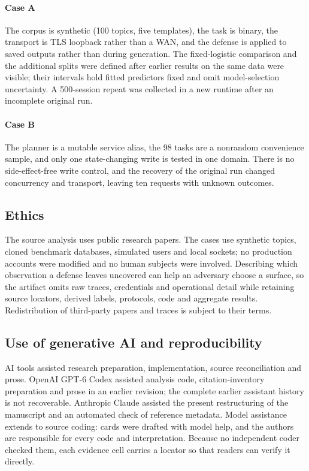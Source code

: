 \paragraph{Case A}
The corpus is synthetic (100 topics, five templates), the task is binary, the transport is TLS loopback rather than a WAN, and the defense is applied to saved outputs rather than during generation. The fixed-logistic comparison and the additional splits were defined after earlier results on the same data were visible; their intervals hold fitted predictors fixed and omit model-selection uncertainty. A 500-session repeat was collected in a new runtime after an incomplete original run.

\paragraph{Case B}
The planner is a mutable service alias, the 98 tasks are a nonrandom convenience sample, and only one state-changing write is tested in one domain. There is no side-effect-free write control, and the recovery of the original run changed concurrency and transport, leaving ten requests with unknown outcomes.

\subsection{Ethics}\label{sec:ethics}
The source analysis uses public research papers. The cases use synthetic topics, cloned benchmark databases, simulated users and local sockets; no production accounts were modified and no human subjects were involved. Describing which observation a defense leaves uncovered can help an adversary choose a surface, so the artifact omits raw traces, credentials and operational detail while retaining source locators, derived labels, protocols, code and aggregate results. Redistribution of third-party papers and traces is subject to their terms.

\subsection{Use of generative AI and reproducibility}\label{sec:ai-use}
AI tools assisted research preparation, implementation, source reconciliation and prose. OpenAI GPT-6 Codex assisted analysis code, citation-inventory preparation and prose in an earlier revision; the complete earlier assistant history is not recoverable. Anthropic Claude assisted the present restructuring of the manuscript and an automated check of reference metadata. Model assistance extends to source coding: cards were drafted with model help, and the authors are responsible for every code and interpretation. Because no independent coder checked them, each evidence cell carries a locator so that readers can verify it directly.

